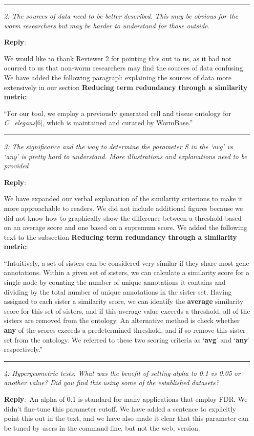 \documentclass[12pt,stdletter,orderfromtodate,sigleft]{newlfm}
\newcommand{\pointRaised}[2]{\medskip \hrule \noindent 
                \textsl{{\fontseries{b} #1}: #2}}
\newcommand{\reply}{\noindent \textbf{Reply}:\ }
\begin{document}
\begin{newlfm}
\pointRaised{2}{The sources of data need to be better described. This may be obvious for the worm researchers but may be harder to understand for those outside.}

\reply{We would like to thank Reviewer 2 for pointing this out to us, as it had not ocurred to us that non-worm researchers may find the sources of data confusing. We have added the following paragraph explaining the sources of data more extensively in our section \textbf{Reducing term redundancy through a similarity metric}:

``For our tool, we employ a previously generated cell and tissue ontology for \emph{C.~elegans}[6], which is maintained and curated by WormBase.''

}

\pointRaised{3}{The significance and the way to determine the parameter S in the `avg' vs `any' is pretty hard to understand. More illustrations and explanations need to be provided}

\reply{We have expanded our verbal explanation of the similarity criterions to make it more approachable to readers. We did not include additional figures because we did not know how to graphically show the difference between a threshold based on an average score and one based on a supremum score. We added the following text to the subsection \textbf{Reducing term redundancy through a similarity metric}:

``Intuitively, a set of sisters can be considered very similar if they share most gene annotations. Within a given set of sisters, we can calculate a similarity score for a single node by counting the number of unique annotations it contains and dividing by the total number of unique annotations in the sister set. Having assigned to each sister a similarity score, we can identify the \textbf{average} similarity score for this set of sisters, and if this average value exceeds a threshold, all of the sisters are removed from the ontology. An alternative method is check whether \textbf{any} of the scores exceeds a predetermined threshold, and if so remove this sister set from the ontology. We referred to these two scoring criteria as `\textbf{avg}' and `\textbf{any}' respectively.''

}

\pointRaised{4}{Hypergeometric tests. What was the benefit of setting alpha to 0.1 vs 0.05 or another value? Did you find this using some of the established datasets?}

\reply{An alpha of 0.1 is standard for many applications that employ FDR. We didn’t fine-tune this parameter cutoff. We have added a sentence to explicitly point this out in the text, and we have also made it clear that this parameter can be tuned by users in the command-line, but not the web, version. 
}

\end{newlfm}
\end{document}
